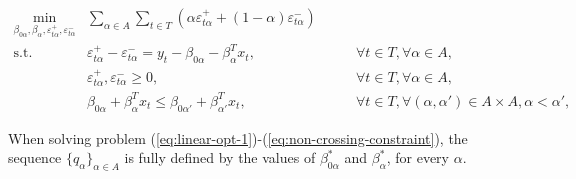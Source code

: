 \begin{eqnarray}
\label{eq:non-crossing-quantiles1par}
\min_{\beta_{0\alpha},\beta_\alpha,\varepsilon_{t\alpha}^{+}, \varepsilon_{t\alpha}^{-}} &  \sum_{\alpha \in A} \sum_{t \in T}\left(\alpha \varepsilon_{t \alpha}^{+}+(1-\alpha)\varepsilon_{t \alpha}^{-}\right) & \label{eq:linear-opt-1} \\
\mbox{s.t. } & \varepsilon_{t \alpha}^{+}-\varepsilon_{t \alpha}^{-}=y_{t} - \beta_{0\alpha} - \beta_{\alpha}^T x_{t}, & \qquad\forall t \in T,\forall \alpha \in A,\\
& \varepsilon_{t\alpha}^+,\varepsilon_{t\alpha}^- \geq 0, & \qquad\forall t \in T,\forall \alpha \in A,\\ \label{eq:non-crossing-constraintpar}
& \beta_{0\alpha} + \beta_{\alpha}^T x_{t} \leq \beta_{0\alpha'} + \beta_{\alpha'}^T x_{t}, & \qquad \forall t \in T, \forall (\alpha, \alpha') \in A \times A,  \alpha < \alpha', 
\end{eqnarray}


When solving problem (\ref{eq:linear-opt-1})-(\ref{eq:non-crossing-constraint}), the sequence $\{ q_\alpha \}_{\alpha \in A}$ is fully defined by the values of $\beta^*_{0\alpha}$ and $\beta^*_\alpha$, for every $\alpha$.



